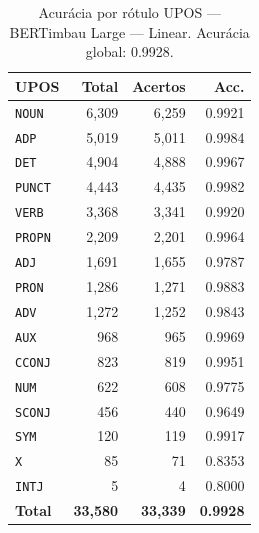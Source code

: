 \begin{table}[ht]
\centering
\footnotesize
\begin{tabular}{lrrr}
\toprule
\textbf{UPOS} & \textbf{Total} & \textbf{Acertos} & \textbf{Acc.} \\
\midrule
\texttt{NOUN} & 6,309 & 6,259 & 0.9921 \\
\texttt{ADP} & 5,019 & 5,011 & 0.9984 \\
\texttt{DET} & 4,904 & 4,888 & 0.9967 \\
\texttt{PUNCT} & 4,443 & 4,435 & 0.9982 \\
\texttt{VERB} & 3,368 & 3,341 & 0.9920 \\
\texttt{PROPN} & 2,209 & 2,201 & 0.9964 \\
\texttt{ADJ} & 1,691 & 1,655 & 0.9787 \\
\texttt{PRON} & 1,286 & 1,271 & 0.9883 \\
\texttt{ADV} & 1,272 & 1,252 & 0.9843 \\
\texttt{AUX} & 968 & 965 & 0.9969 \\
\texttt{CCONJ} & 823 & 819 & 0.9951 \\
\texttt{NUM} & 622 & 608 & 0.9775 \\
\texttt{SCONJ} & 456 & 440 & 0.9649 \\
\texttt{SYM} & 120 & 119 & 0.9917 \\
\texttt{X} & 85 & 71 & 0.8353 \\
\texttt{INTJ} & 5 & 4 & 0.8000 \\
\midrule
\textbf{Total} & \textbf{33,580} & \textbf{33,339} & \textbf{0.9928} \\
\bottomrule
\end{tabular}
\caption{Acurácia por rótulo UPOS — BERTimbau Large — Linear. Acurácia global: 0.9928.}
\label{tab:upos-acc-predict-test-df-bertimbau-large-linear}
\end{table}


